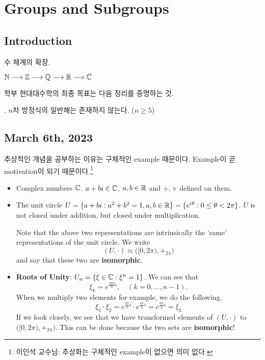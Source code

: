\chapter{Groups and Subgroups}

\section*{Introduction}



수 체계의 확장.
\begin{center}
    \(\mathbb{N} \longrightarrow \mathbb{Z} \longrightarrow \mathbb{Q} \longrightarrow \mathbb{R} \longrightarrow \mathbb{C}\)
\end{center}

학부 현대대수학의 최종 목표는 다음 정리를 증명하는 것.

\thm. \(n\)차 방정식의 일반해는 존재하지 않는다. (\(n \geq 5\))

\section*{March 6th, 2023}

추상적인 개념을 공부하는 이유는 구체적인 example 때문이다. Example이 곧 motivation이 되기 때문이다.\footnote{이인석 교수님: 추상화는 구체적인 example이 없으면 의미 없다.}

\begin{itemize}
    \item Complex numbers \(\mathbb{C}\). \(a + bi \in \mathbb{C}\), \(a, b \in \mathbb{R}\) and \(+, \times\) defined on them.
    \item The unit circle \(U = \{a + bi : a^2 + b^2 = 1, a, b \in \mathbb{R}\} = \{e^{i\theta} : 0 \leq \theta < 2\pi\}\). \(U\) is not closed under addition, but closed under multiplication.

          Note that the above two representations are intrinsically the `same' representations of the unit circle. We write
          \[
              (U, \cdot) \approx \bigl([0, 2\pi), +_{2\pi}\bigr)
          \]
          and say that these two are \textbf{isomorphic}.
    \item \textbf{Roots of Unity}: \(U_n = \{\xi \in \mathbb{C} : \xi^n = 1\}\). We can see that
          \[
              \xi_k = e^{\frac{2\pi k}{n}i}, \quad (k = 0, \dots, n - 1).
          \]
          When we multiply two elements for example, we do the following.
          \[
              \xi_1 \cdot \xi_2 = e^{\frac{2\pi}{n}i} \cdot e^{\frac{4\pi}{n}i} = e^{\frac{6\pi}{n}i} = \xi_3
          \]
          If we look closely, we see that we have transformed elements of \((U, \cdot)\) to \(\bigl([0, 2\pi), +_{2\pi}\bigr)\). This can be done because the two sets are \textbf{isomorphic}!
\end{itemize}

\pagebreak
